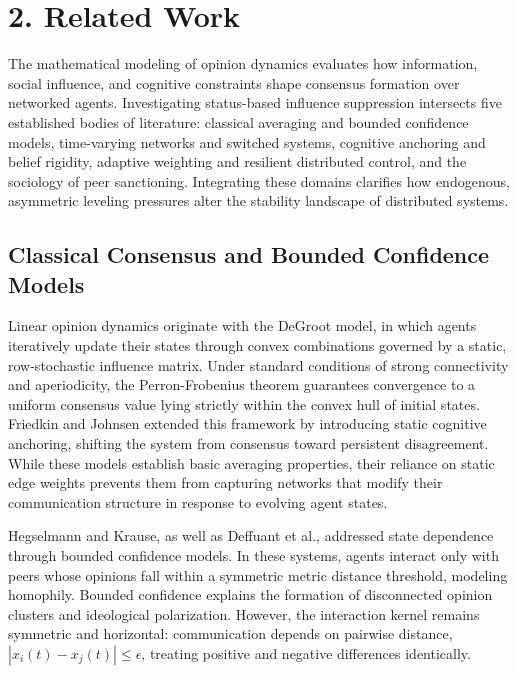 \section{2. Related Work}
The mathematical modeling of opinion dynamics evaluates how information, social influence, and cognitive constraints shape consensus formation over networked agents\cite{degroot1974reaching}. Investigating status-based influence suppression intersects five established bodies of literature: classical averaging and bounded confidence models, time-varying networks and switched systems, cognitive anchoring and belief rigidity, adaptive weighting and resilient distributed control, and the sociology of peer sanctioning\cite{degroot1974reaching}. Integrating these domains clarifies how endogenous, asymmetric leveling pressures alter the stability landscape of distributed systems\cite{degroot1974reaching}.

\subsection{Classical Consensus and Bounded Confidence Models}
Linear opinion dynamics originate with the DeGroot model, in which agents iteratively update their states through convex combinations governed by a static, row-stochastic influence matrix\cite{degroot1974reaching}. Under standard conditions of strong connectivity and aperiodicity, the Perron-Frobenius theorem guarantees convergence to a uniform consensus value lying strictly within the convex hull of initial states\cite{degroot1974reaching}. Friedkin and Johnsen extended this framework by introducing static cognitive anchoring, shifting the system from consensus toward persistent disagreement\cite{degroot1974reaching,hajnal1958weak}. While these models establish basic averaging properties, their reliance on static edge weights prevents them from capturing networks that modify their communication structure in response to evolving agent states\cite{degroot1974reaching}.

Hegselmann and Krause, as well as Deffuant et al., addressed state dependence through bounded confidence models\cite{degroot1974reaching,hajnal1958weak}. In these systems, agents interact only with peers whose opinions fall within a symmetric metric distance threshold, modeling homophily\cite{degroot1974reaching,hajnal1958weak}. Bounded confidence explains the formation of disconnected opinion clusters and ideological polarization\cite{degroot1974reaching,hajnal1958weak}. However, the interaction kernel remains symmetric and horizontal: communication depends on pairwise distance, $|x_i(t) - x_j(t)| \le \epsilon$, treating positive and negative differences identically\cite{degroot1974reaching,hajnal1958weak}.

